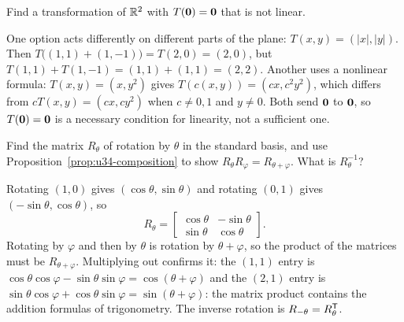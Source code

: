 \begin{exercise}\label{exr:u34-nonlinear}
Find a transformation of $\mathbb{R}^2$ with $T(\boldsymbol{0})=\boldsymbol{0}$ that is not linear.
\end{exercise}
\begin{solution}
One option acts differently on different parts of the plane: $T(x,y)=(|x|,|y|)$. Then
$T\bigl((1,1)+(1,-1)\bigr)=T(2,0)=(2,0)$, but $T(1,1)+T(1,-1)=(1,1)+(1,1)=(2,2)$. Another uses a
nonlinear formula: $T(x,y)=(x,y^2)$ gives $T(c(x,y))=(cx,c^2y^2)$, which differs from
$cT(x,y)=(cx,cy^2)$ when $c\ne0,1$ and $y\ne0$. Both send $\boldsymbol{0}$ to $\boldsymbol{0}$, so $T(\boldsymbol{0})=\boldsymbol{0}$ is a
necessary condition for linearity, not a sufficient one.
\end{solution}

\begin{exercise}\label{exr:u34-rotation}
Find the matrix $R_\theta$ of rotation by $\theta$ in the standard basis, and use
Proposition~\ref{prop:u34-composition} to show $R_\theta R_\varphi=R_{\theta+\varphi}$. What is $R_\theta^{-1}$?
\end{exercise}
\begin{solution}
Rotating $(1,0)$ gives $(\cos\theta,\sin\theta)$ and rotating $(0,1)$ gives $(-\sin\theta,\cos\theta)$, so
\[
  R_\theta=\begin{bmatrix}\cos\theta&-\sin\theta\\\sin\theta&\cos\theta\end{bmatrix}.
\]
Rotating by $\varphi$ and
then by $\theta$ is rotation by $\theta+\varphi$, so the product of the matrices must be $R_{\theta+\varphi}$.
Multiplying out confirms it: the $(1,1)$ entry is $\cos\theta\cos\varphi-\sin\theta\sin\varphi=\cos(\theta+\varphi)$ and
the $(2,1)$ entry is $\sin\theta\cos\varphi+\cos\theta\sin\varphi=\sin(\theta+\varphi)$: the matrix product contains the
addition formulas of trigonometry. The inverse rotation is $R_{-\theta}=R_\theta^{\mathsf{T}}$.
\end{solution}

